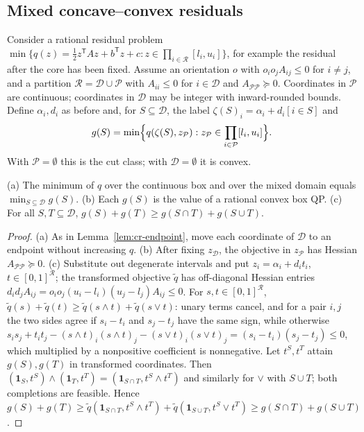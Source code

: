 \subsection{Mixed concave--convex residuals}\label{sec:cr-mixed}

Consider a rational residual problem
$\min\{q(z)=\frac12z^{\mathsf T}Az+b^{\mathsf T}z+c : z\in\prod_{i\in\mathcal R}[l_i,u_i]\}$,
for example the residual after the core has been fixed. Assume an
orientation $o$ with $o_io_jA_{ij}\le0$ for $i\ne j$, and a partition
$\mathcal R=\mathcal D\cup\mathcal P$ with $A_{ii}\le0$ for $i\in\mathcal D$ and
$A_{\mathcal P\mathcal P}\succeq0$. Coordinates in $\mathcal P$ are
continuous; coordinates in $\mathcal D$ may be integer with inward-rounded
bounds. Define $\alpha_i,d_i$ as before and, for
$S\subseteq\mathcal D$, the label $\zeta(S)_i=\alpha_i+d_i[i\in S]$ and
\[
g(S)=\min\Bigl\{q(\zeta(S),z_{\mathcal P}) :
z_{\mathcal P}\in\prod_{i\in\mathcal P}[l_i,u_i]\Bigr\}.
\]
With $\mathcal P=\emptyset$ this is the cut class; with
$\mathcal D=\emptyset$ it is convex.

\begin{proposition}\label{prop:cr-submod}
(a) The minimum of $q$ over the continuous box and over the mixed domain
equals $\min_{S\subseteq\mathcal D}g(S)$.
(b) Each $g(S)$ is the value of a rational convex box QP.
(c) For all $S,T\subseteq\mathcal D$,
$g(S)+g(T)\ge g(S\cap T)+g(S\cup T)$.
\end{proposition}
\begin{proof}
(a) As in Lemma~\ref{lem:cr-endpoint}, move each coordinate of
$\mathcal D$ to an endpoint without increasing $q$. (b) After fixing
$z_{\mathcal D}$, the objective in $z_{\mathcal P}$ has Hessian
$A_{\mathcal P\mathcal P}\succeq0$. (c) Substitute out degenerate intervals
and put $z_i=\alpha_i+d_it_i$, $t\in[0,1]^{\mathcal R}$; the transformed objective
$\tilde q$ has off-diagonal Hessian entries
$d_id_jA_{ij}=o_io_j(u_i-l_i)(u_j-l_j)A_{ij}\le0$. For $s,t\in[0,1]^{\mathcal R}$,
$\tilde q(s)+\tilde q(t)\ge\tilde q(s\wedge t)+\tilde q(s\vee t)$: unary terms
cancel, and for a pair $i,j$ the two sides agree if $s_i-t_i$ and
$s_j-t_j$ have the same sign, while otherwise
$s_is_j+t_it_j-(s\wedge t)_i(s\wedge t)_j-(s\vee t)_i(s\vee t)_j
=(s_i-t_i)(s_j-t_j)\le0$, which multiplied by a nonpositive coefficient is
nonnegative. Let $t^S,t^T$ attain $g(S),g(T)$ in transformed
coordinates. Then $(\mathbf 1_S,t^S)\wedge(\mathbf 1_T,t^T)
=(\mathbf 1_{S\cap T},t^S\wedge t^T)$ and similarly for $\vee$ with
$S\cup T$; both completions are feasible. Hence
$g(S)+g(T)\ge\tilde q(\mathbf 1_{S\cap T},t^S\wedge t^T)
+\tilde q(\mathbf 1_{S\cup T},t^S\vee t^T)\ge g(S\cap T)+g(S\cup T)$.
\end{proof}

